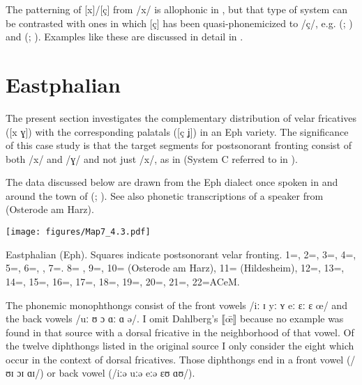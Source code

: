 The patterning of [x]/[ç] from /x/ is allophonic in , but that type of system can be contrasted with ones in which [ç] has been quasi-phonemicized to /ç/, e.g.  (\citealt{Arens1908}; ) and  (\citealt{Böger1906}; ). Examples like these are discussed in detail in .

\section{{Eastphalian}}\label{sec:4.4}

The present section investigates the complementary distribution of velar fricatives ([x ɣ]) with the corresponding palatals ([ç ʝ]) in an Eph variety. The significance of this case study is that the target segments for postsonorant fronting consist of both /x/ and /ɣ/ and not just /x/, as in  (System C referred to in ).

The data discussed below are drawn from the Eph dialect once spoken in and around the town of  (\citealt{Dahlberg1934,Dahlberg1937}; ). See also  phonetic transcriptions of a speaker from  (Osterode am Harz).

\begin{map}
\texttt{[image: figures/Map7\_4.3.pdf]}
  \caption[Eastphalian]{Eastphalian (Eph). Squares indicate postsonorant velar fronting. 1=\citet{Bierwirth1890}, 2=\citet{Heibey1891}, 3=\citet{Roloff1902}, 4=\citet{Block1910}, 5=\citet{Damköhler1919}, 6=\citet{Jungandreas1926}, \citet{Jungandreas1927}, 7=\citet{Jarfe1929}. 8= \citet{Löfstedt1933}, 9=\citet{Dahlberg1934, Dahlberg1937}, 10=\citet{Mackel1939} (Osterode am Harz), 11=\citet{Mackel1939} (Hildesheim), 12=\citet{Hille1939}, 13=\citet{Hassel1942}, 14=\citet{Pahl1943}, 15=\citet{Brugge1944}, 16=\citet{Schütze1953}, 17=\citet{BethgeFlechsig1958}, 18=\citet{Lange1963}, 19=\citet{BethgeBonnin1969}, 20=\citet{BethgeBonnin1969}, 21=\citet{Göschel1973}, 22=ACeM.}
  \label{fig:4.3}\label{map:7}
\end{map}

The phonemic monophthongs consist of the front vowels /iː ɪ yː ʏ eː ɛː ɛ œ/ and the back vowels /uː ʊ ɔ ɑː ɑ ə/. I omit Dahlberg’s ⟦\={œ}⟧ because no example was found in that source with a dorsal fricative in the neighborhood of that vowel. Of the twelve diphthongs listed in the original source I only consider the eight which occur in the context of dorsal fricatives. Those diphthongs end in a front vowel (/ʊɪ ɔɪ ɑɪ/) or back vowel (/iːə uːə eːə ɛʊ ɑʊ/).

